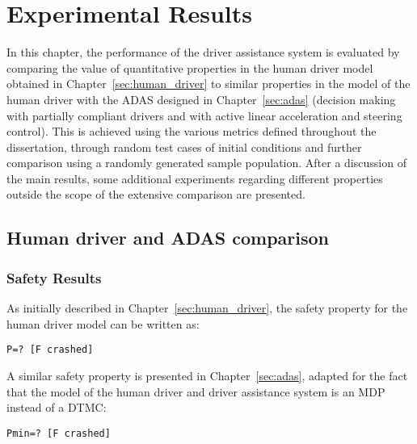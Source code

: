 \chapter{Experimental Results}
\label{sec:results}

In this chapter, the performance of the driver assistance system is evaluated by comparing the value of quantitative properties in the human driver model obtained in Chapter~\ref{sec:human_driver} to similar properties in the model of the human driver with the ADAS designed in Chapter~\ref{sec:adas} (decision making with partially compliant drivers and with active linear acceleration and steering control). This is achieved using the various metrics defined throughout the dissertation, through random test cases of initial conditions and further comparison using a randomly generated sample population. After a discussion of the main results, some additional experiments regarding different properties outside the scope of the extensive comparison are presented.

\section{Human driver and ADAS comparison}

\subsection{Safety Results}
\label{sec:res_safety}

As initially described in Chapter~\ref{sec:human_driver}, the safety property for the human driver model can be written as:

\begin{minipage}{\linewidth}
{\vspace{1em}
\begin{lstlisting}
P=? [F crashed]
\end{lstlisting}
}
\end{minipage}

A similar safety property is presented in Chapter~\ref{sec:adas}, adapted for the fact that the model of the human driver and driver assistance system is an MDP instead of a DTMC:

\begin{minipage}{\linewidth}
{\vspace{1em}
\begin{lstlisting}
Pmin=? [F crashed]
\end{lstlisting}
}
\end{minipage}

